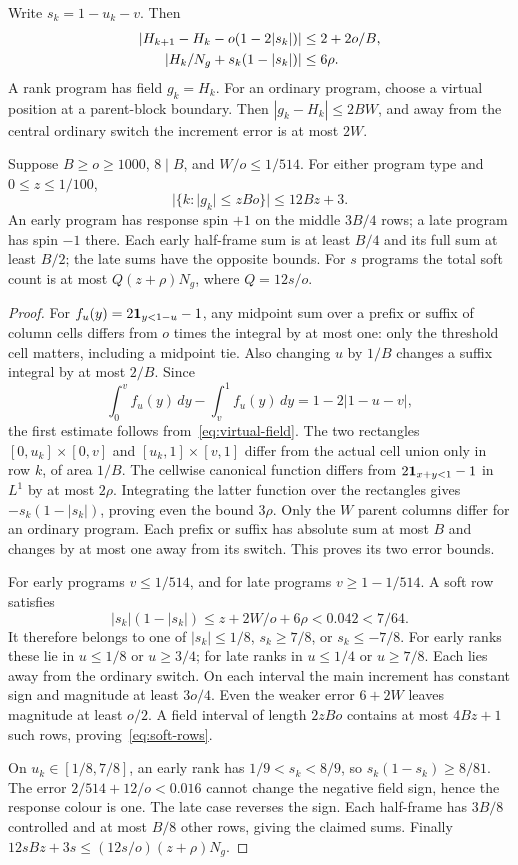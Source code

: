 \begin{lemma}\label{lem:soft-fields}
Write $s_k=1-u_k-v$. Then
\begin{align}
|H_{k+1}-H_k-o(1-2|s_k|)|&\leq2+2o/B,\notag\\
|H_k/N_g+s_k(1-|s_k|)|&\leq6\rho.\label{eq:virtual-estimates}
\end{align}
A rank program has field $g_k=H_k$. For an ordinary program, choose a virtual position at a parent-block boundary. Then $|g_k-H_k|\leq2BW$, and away from the central ordinary switch the increment error is at most $2W$.

Suppose $B\geq o\geq1000$, $8\mid B$, and $W/o\leq1/514$. For either program type and $0\leq z\leq1/100$,
\begin{equation}\label{eq:soft-rows}
|\{k:|g_k|\leq zBo\}|\leq12Bz+3.
\end{equation}
An early program has response spin $+1$ on the middle $3B/4$ rows; a late program has spin $-1$ there. Each early half-frame sum is at least $B/4$ and its full sum at least $B/2$; the late sums have the opposite bounds. For $s$ programs the total soft count is at most $Q(z+\rho)N_g$, where $Q=12s/o$.
\end{lemma}
\begin{proof}
For $f_u(y)=2\mathbf 1_{y<1-u}-1$, any midpoint sum over a prefix or suffix of column cells differs from $o$ times the integral by at most one: only the threshold cell matters, including a midpoint tie. Also changing $u$ by $1/B$ changes a suffix integral by at most $2/B$. Since
\[
\int_0^v f_u(y)\,dy-\int_v^1 f_u(y)\,dy=1-2|1-u-v|,
\]
the first estimate follows from~\eqref{eq:virtual-field}. The two rectangles $[0,u_k]\times[0,v]$ and $[u_k,1]\times[v,1]$ differ from the actual cell union only in row $k$, of area $1/B$. The cellwise canonical function differs from $2\mathbf 1_{x+y<1}-1$ in $L^1$ by at most $2\rho$. Integrating the latter function over the rectangles gives $-s_k(1-|s_k|)$, proving even the bound $3\rho$. Only the $W$ parent columns differ for an ordinary program. Each prefix or suffix has absolute sum at most $B$ and changes by at most one away from its switch. This proves its two error bounds.

For early programs $v\leq1/514$, and for late programs $v\geq1-1/514$. A soft row satisfies
\[
|s_k|(1-|s_k|)\leq z+2W/o+6\rho<0.042<7/64.
\]
It therefore belongs to one of $|s_k|\leq1/8$, $s_k\geq7/8$, or $s_k\leq-7/8$. For early ranks these lie in $u\leq1/8$ or $u\geq3/4$; for late ranks in $u\leq1/4$ or $u\geq7/8$. Each lies away from the ordinary switch. On each interval the main increment has constant sign and magnitude at least $3o/4$. Even the weaker error $6+2W$ leaves magnitude at least $o/2$. A field interval of length $2zBo$ contains at most $4Bz+1$ such rows, proving~\eqref{eq:soft-rows}.

On $u_k\in[1/8,7/8]$, an early rank has $1/9<s_k<8/9$, so $s_k(1-s_k)\geq8/81$. The error $2/514+12/o<0.016$ cannot change the negative field sign, hence the response colour is one. The late case reverses the sign. Each half-frame has $3B/8$ controlled and at most $B/8$ other rows, giving the claimed sums. Finally $12sBz+3s\leq(12s/o)(z+\rho)N_g$.
\end{proof}

